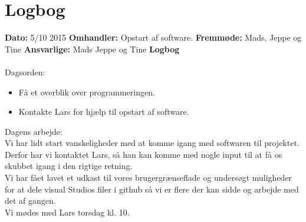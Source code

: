 \chapter{Logbog}

\textbf{Dato:} 5/10 2015 
\textbf{Omhandler:} Opstart af software. 
\textbf{Fremmøde:} Mads, Jeppe og Tine
\textbf{Ansvarlige:} Mads Jeppe og Tine
\textbf{Logbog}
\\
\\
Dagsorden:
\begin{itemize}
	\item Få et overblik over programmeringen.\\
	\item Kontakte Lars for hjælp til opstart af software.\\  
\end{itemize}

Dagens arbejde: \\
Vi har lidt start vanskeligheder med at komme igang med softwaren til projektet. Derfor har vi kontaktet Lars, så han kan komme med nogle input til at få os skubbet igang i den rigtige retning. \\
Vi har fået lavet et udkast til vores brugergrænseflade og undersøgt muligheder for at dele visual Studios filer i github så vi er flere der kan sidde og arbejde med det af gangen.\\
Vi mødes med Lars torsdag kl. 10.\\



